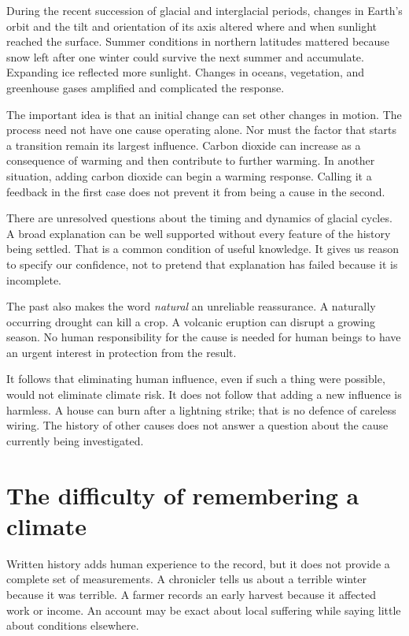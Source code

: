 \documentclass[12pt,a4paper]{book}
\begin{document}
During the recent succession of glacial and interglacial periods, changes in Earth's orbit and the tilt and orientation of its axis altered where and when sunlight reached the surface. Summer conditions in northern latitudes mattered because snow left after one winter could survive the next summer and accumulate. Expanding ice reflected more sunlight. Changes in oceans, vegetation, and greenhouse gases amplified and complicated the response.

The important idea is that an initial change can set other changes in motion. The process need not have one cause operating alone. Nor must the factor that starts a transition remain its largest influence. Carbon dioxide can increase as a consequence of warming and then contribute to further warming. In another situation, adding carbon dioxide can begin a warming response. Calling it a feedback in the first case does not prevent it from being a cause in the second.

There are unresolved questions about the timing and dynamics of glacial cycles. A broad explanation can be well supported without every feature of the history being settled. That is a common condition of useful knowledge. It gives us reason to specify our confidence, not to pretend that explanation has failed because it is incomplete.

The past also makes the word \emph{natural} an unreliable reassurance. A naturally occurring drought can kill a crop. A volcanic eruption can disrupt a growing season. No human responsibility for the cause is needed for human beings to have an urgent interest in protection from the result.

It follows that eliminating human influence, even if such a thing were possible, would not eliminate climate risk. It does not follow that adding a new influence is harmless. A house can burn after a lightning strike; that is no defence of careless wiring. The history of other causes does not answer a question about the cause currently being investigated.

\section*{The difficulty of remembering a climate}

Written history adds human experience to the record, but it does not provide a complete set of measurements. A chronicler tells us about a terrible winter because it was terrible. A farmer records an early harvest because it affected work or income. An account may be exact about local suffering while saying little about conditions elsewhere.
\end{document}
